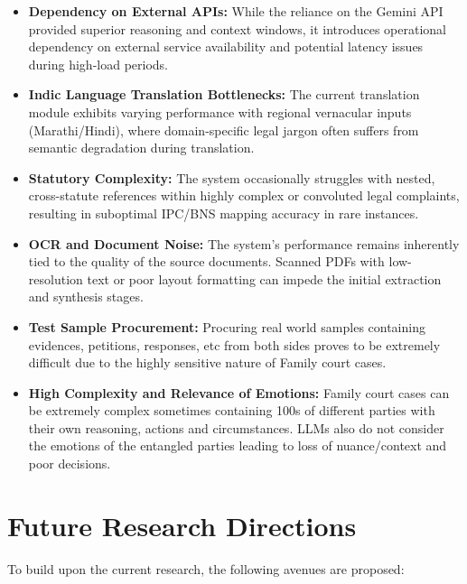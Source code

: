 \begin{itemize}
	\item \textbf{Dependency on External APIs:} While the reliance on the Gemini API provided superior reasoning and context windows, it introduces operational dependency on external service availability and potential latency issues during high-load periods.
	\item \textbf{Indic Language Translation Bottlenecks:} The current translation module exhibits varying performance with regional vernacular inputs (Marathi/Hindi), where domain-specific legal jargon often suffers from semantic degradation during translation.
	\item \textbf{Statutory Complexity:} The system occasionally struggles with nested, cross-statute references within highly complex or convoluted legal complaints, resulting in suboptimal IPC/BNS mapping accuracy in rare instances.
	\item \textbf{OCR and Document Noise:} The system's performance remains inherently tied to the quality of the source documents. Scanned PDFs with low-resolution text or poor layout formatting can impede the initial extraction and synthesis stages.
	\item \textbf{Test Sample Procurement:} Procuring real world samples containing evidences, petitions, responses, etc from both sides proves to be extremely difficult due to the highly sensitive nature of Family court cases.
	\item \textbf{High Complexity and Relevance of Emotions:} Family court cases can be extremely complex sometimes containing 100s of different parties with their own reasoning, actions and circumstances. LLMs also do not consider the emotions of the entangled parties leading to loss of nuance/context and poor decisions.
\end{itemize}

\section{Future Research Directions}
To build upon the current research, the following avenues are proposed:

